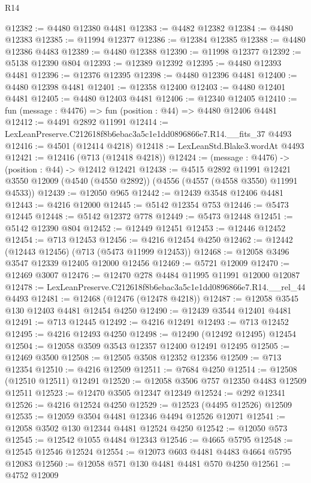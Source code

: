 \begin{lexlean}{R14}
\begin{coremodule}
@12382 := @4480 @12380 @4481
@12383 := @4482 @12382
@12384 := @4480 @12383
@12385 := @11994 @12377
@12386 := @12384 @12385
@12388 := @4480 @12386 @4483
@12389 := @4480 @12388
@12390 := @11998 @12377
@12392 := @5138 @12390 @804
@12393 := @12389 @12392
@12395 := @4480 @12393 @4481
@12396 := @12376 @12395
@12398 := @4480 @12396 @4481
@12400 := @4480 @12398 @4481
@12401 := @12358 @12400
@12403 := @4480 @12401 @4481
@12405 := @4480 @12403 @4481
@12406 := @12340 @12405
@12410 := fun (message : @4476) => fun (position : @44) => @4480 @12406 @4481
@12412 := @4491 @2892 @11991
@12414 := LexLeanPreserve.C212618f8b6ebac3a5c1e1dd0896866e7.R14.__fits_37 @4493
@12416 := @4501 (@12414 @4218)
@12418 := LexLeanStd.Blake3.wordAt @4493
@12421 := @12416 (@713 (@12418 @4218))
@12424 := (message : @4476) -> (position : @44) -> @12412 @12421
@12438 := @4515
    @2892
    @11991
    @12421
    @3550
    @12009
    (@4540 (@4550 @2892))
    (@4556 (@4557 (@4558 @3550) @11991 @4533))
@12439 := @12050 @965
@12442 := @12439 @3548 @12406 @4481
@12443 := @4216 @12000
@12445 := @5142 @12354 @753
@12446 := @5473 @12445
@12448 := @5142 @12372 @778
@12449 := @5473 @12448
@12451 := @5142 @12390 @804
@12452 := @12449 @12451
@12453 := @12446 @12452
@12454 := @713 @12453
@12456 := @4216 @12454 @4250
@12462 := @12442 (@12443 @12456) (@713 (@5473 @11999 @12453))
@12468 := @12058 @3496 @3547 @12339 @12405 @12000 @12456
@12469 := @5721 @12009
@12470 := @12469 @3007
@12476 := @12470 @278 @4484 @11995 @11991 @12000 @12087
@12478 := LexLeanPreserve.C212618f8b6ebac3a5c1e1dd0896866e7.R14.__rel_44 @4493
@12481 := @12468 (@12476 (@12478 @4218))
@12487 := @12058 @3545 @130 @12403 @4481 @12454 @4250
@12490 := @12439 @3544 @12401 @4481
@12491 := @713 @12445
@12492 := @4216 @12491
@12493 := @713 @12452
@12495 := @4216 @12493 @4250
@12498 := @12490 (@12492 @12495) @12454
@12504 := @12058 @3509 @3543 @12357 @12400 @12491 @12495
@12505 := @12469 @3500
@12508 := @12505 @3508 @12352 @12356
@12509 := @713 @12354
@12510 := @4216 @12509
@12511 := @7684 @4250
@12514 := @12508 (@12510 @12511) @12491
@12520 := @12058 @3506 @757 @12350 @4483 @12509 @12511
@12523 := @12470 @3505 @12347 @12349
@12524 := @292 @12341
@12526 := @4216 @12524 @4250
@12529 := @12523 (@4495 @12526) @12509
@12535 := @12059 @3504 @4481 @12346 @4494 @12526 @12071
@12541 := @12058 @3502 @130 @12344 @4481 @12524 @4250
@12542 := @12050 @573
@12545 := @12542 @1055 @4484 @12343
@12546 := @4665 @5795
@12548 := @12545 @12546 @12524
@12554 := @12073 @603 @4481 @4483 @4664 @5795 @12083
@12560 := @12058 @571 @130 @4481 @4481 @570 @4250
@12561 := @4752 @12009

\end{coremodule}
\end{lexlean}
